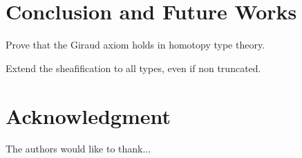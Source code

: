 \documentclass[conference]{IEEEtran}
\begin{document}
\section{Conclusion and Future Works}
\label{sec:future-works}

Prove that the Giraud axiom holds in homotopy type theory.

Extend the sheafification to all types, even if non truncated.







\section*{Acknowledgment}


The authors would like to thank...






%
%










\end{document}
